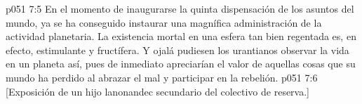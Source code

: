 \vs p051 7:5 En el momento de inaugurarse la quinta dispensación de los asuntos del mundo, ya se ha conseguido instaurar una magnífica administración de la actividad planetaria. La existencia mortal en una esfera tan bien regentada es, en efecto, estimulante y fructífera. Y ojalá pudiesen los urantianos observar la vida en un planeta así, pues de inmediato apreciarían el valor de aquellas cosas que su mundo ha perdido al abrazar el mal y participar en la rebelión.
\vsetoff
\vs p051 7:6 [Exposición de un hijo lanonandec secundario del colectivo de reserva.]
